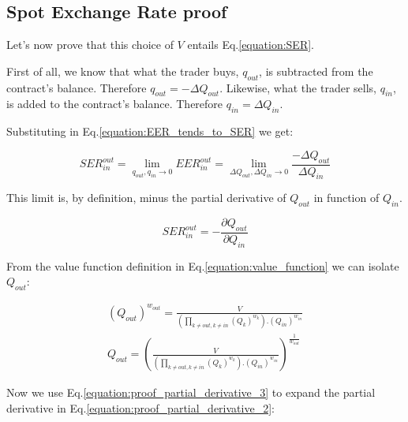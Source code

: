 \documentclass[11pt]{amsart}
\begin{document}
\subsection{Spot Exchange Rate proof}
Let's now prove that this choice of $V$ entails Eq.\ref{equation:SER}.

First of all, we know that what the trader buys, $q_{out}$, is subtracted from the contract's balance. Therefore $q_{out}=-\Delta Q_{out}$. Likewise, what the trader sells, $q_{in}$, is added to the contract's balance. Therefore $q_{in} = \Delta Q_{in}$.

Substituting in Eq.\ref{equation:EER_tends_to_SER} we get:

\begin{equation}
\label{equation:proof_partial_derivative_1}
SER^{out}_{in} = \lim_{q_{out},q_{in}\to 0} EER^{out}_{in} = \lim_{\Delta Q_{out},\Delta Q_{in}\to 0} \frac{-\Delta Q_{out}}{\Delta Q_{in}}
\end{equation}

This limit is, by definition, minus the partial derivative of $Q_{out}$ in function of $Q_{in}$. 

\begin{equation}
\label{equation:proof_partial_derivative_2}
SER^{out}_{in} = -\frac{\partial Q_{out}}{\partial Q_{in}}
\end{equation}

From the value function definition in Eq.\ref{equation:value_function} we can isolate $Q_{out}$:

\begin{equation}
\label{equation:proof_partial_derivative_3}
\begin{gathered}
(Q_{out})^{w_{out}} =  \frac{V}{\left(\prod_{k\neq out, k\neq in}(Q_k)^{w_k}\right).(Q_{in})^{w_{in}}}\\
Q_{out} =  \left(\frac{V}{\left(\prod_{k\neq out, k\neq in}(Q_k)^{w_k}\right).(Q_{in})^{w_{in}}}\right)^\frac{1}{w_{out}}
\end{gathered}
\end{equation}

Now we use Eq.\ref{equation:proof_partial_derivative_3} to expand the partial derivative in Eq.\ref{equation:proof_partial_derivative_2}:
\end{document}
